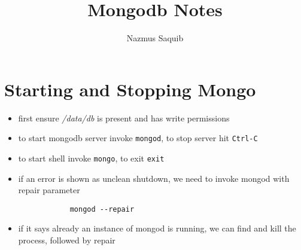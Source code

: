 \documentclass[a4paper, 12pt]{article}
\begin{document}
\title{Mongodb Notes}
\author{Nazmus Saquib}

\maketitle
\tableofcontents

\section{Starting and Stopping Mongo}
\begin{itemize}
	\item first ensure \emph{/data/db} is present and has write permissions
	\item to start mongodb server invoke \verb|mongod|, to stop server hit \verb|Ctrl-C|
	\item to start shell invoke \verb|mongo|, to exit \verb|exit|
	\item if an error is shown as unclean shutdown, we need to invoke mongod with repair parameter
		\begin{verbatim}
			mongod --repair
		\end{verbatim}
	\item if it says already an instance of mongod is running, we can find and kill the process, followed by repair
\end{itemize}
\end{document}

